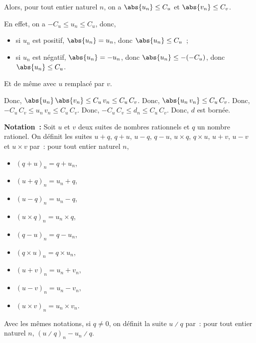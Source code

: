 \begin{itemize}[nosep]
            Alors, pour tout entier naturel $n$, on a $\abs{u_n} \leq C_u$ et $\abs{v_n} \leq C_v$.%
            \begin{foot}
                En effet, on a $-C_u \leq u_n \leq C_u$, donc,
                \begin{itemize}[nosep]
                    \item si $u_n$ est positif, $\abs{u_n} = u_n$, donc $\abs{u_n} \leq C_u$~;
                    \item si $u_n$ est négatif, $\abs{u_n} = -u_n$, donc $\abs{u_n} \leq -(-C_u)$, donc $\abs{u_n} \leq C_u$.
                \end{itemize}
                Et de même avec $u$ remplacé par $v$.
            \end{foot}
            Donc, $\abs{u_n} \, \abs{v_n} \leq C_u \, v_n \leq C_u \, C_v$.
            Donc, $\abs{u_n \, v_n} \leq C_u \, C_v$.
            Donc, $-C_u \, C_v \leq u_n \, v_n \leq C_u \, C_v$.
            Donc, $-C_u \, C_v \leq d_n \leq C_u \, C_v$.
            Donc, $d$ est bornée.
    \end{itemize}

    \done

\medskip

\noindent\textbf{Notation :} Soit $u$ et $v$ deux suites de nombres rationnels et $q$ un nombre rationel.
    On définit les suites $u + q$, $q + u$, $u - q$, $q - u$, $u \times q$, $q \times u$, $u + v$, $u - v$ et $u \times v$ par : pour tout entier naturel $n$, 
    \begin{itemize}[nosep]
        \item $(q + u)_n = q + u_n$,
        \item $(u + q)_n = u_n + q$,
        \item $(u - q)_n = u_n - q$,
        \item $(u \times q)_n = u_n \times q$,
        \item $(q - u)_n = q - u_n$,
        \item $(q \times u)_n = q \times u_n$,
        \item $(u + v)_n = u_n + v_n$,
        \item $(u - v)_n = u_n - v_n$,
        \item $(u \times v)_n = u_n \times v_n$. 
    \end{itemize}
    Avec les mêmes notations, si $q \neq 0$, on définit la suite $u \divslash q$ par : pour tout entier naturel $n$, $(u \divslash q)_n - u_n \divslash q$.

